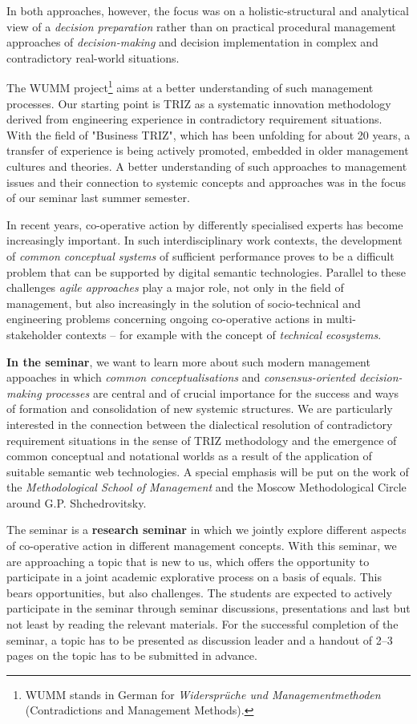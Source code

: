 \documentclass[11pt,a4paper]{article}
\begin{document}
In both approaches, however, the focus was on a holistic-structural and
analytical view of a \emph{decision preparation} rather than on practical
procedural management approaches of \emph{decision-making} and decision
implementation in complex and contradictory real-world situations.

The WUMM project\footnote{WUMM stands in German for \emph{Widersprüche und
    Managementmethoden} (Contradictions and Management Methods).} aims at a
better understanding of such management processes. Our starting point is TRIZ
as a systematic innovation methodology derived from engineering experience in
contradictory requirement situations. With the field of "Business TRIZ", which
has been unfolding for about 20 years, a transfer of experience is being
actively promoted, embedded in older management cultures and theories.  A
better understanding of such approaches to management issues and their
connection to systemic concepts and approaches was in the focus of our seminar
last summer semester.

In recent years, co-operative action by differently specialised experts has
become increasingly important.  In such interdisciplinary work contexts, the
development of \emph{common conceptual systems} of sufficient performance
proves to be a difficult problem that can be supported by digital semantic
technologies.  Parallel to these challenges \emph{agile approaches} play a
major role, not only in the field of management, but also increasingly in the
solution of socio-technical and engineering problems concerning ongoing
co-operative actions in multi-stakeholder contexts -- for example with the
concept of \emph{technical ecosystems}.

\textbf{In the seminar}, we want to learn more about such modern management
appoaches in which \emph{common conceptualisations} and
\emph{consensus-oriented decision-making processes} are central and of crucial
importance for the success and ways of formation and consolidation of new
systemic structures.  We are particularly interested in the connection between
the dialectical resolution of contradictory requirement situations in the
sense of TRIZ methodology and the emergence of common conceptual and
notational worlds as a result of the application of suitable semantic web
technologies.  A special emphasis will be put on the work of the
\emph{Methodological School of Management} and the Moscow Methodological
Circle around G.P. Shchedrovitsky.

The seminar is a \textbf{research seminar} in which we jointly explore
different aspects of co-operative action in different management concepts.
With this seminar, we are approaching a topic that is new to us, which offers
the opportunity to participate in a joint academic explorative process on a
basis of equals. This bears opportunities, but also challenges.  The students
are expected to actively participate in the seminar through seminar
discussions, presentations and last but not least by reading the relevant
materials.  For the successful completion of the seminar, a topic has to be
presented as discussion leader and a handout of 2--3 pages on the topic has to
be submitted in advance.
\end{document}

